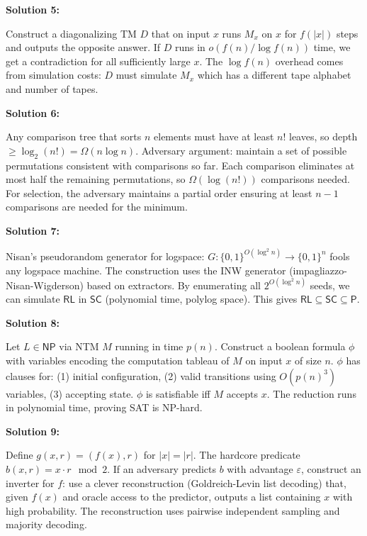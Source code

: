 \documentclass[12pt,a4paper]{exam}
\begin{document}
\textbf{Solution 5:}

Construct a diagonalizing TM $D$ that on input $x$ runs $M_x$ on $x$ for $f(|x|)$ steps and outputs the opposite answer. If $D$ runs in $o(f(n)/\log f(n))$ time, we get a contradiction for all sufficiently large $x$. The $\log f(n)$ overhead comes from simulation costs: $D$ must simulate $M_x$ which has a different tape alphabet and number of tapes.

\vspace{0.5cm}

\textbf{Solution 6:}

Any comparison tree that sorts $n$ elements must have at least $n!$ leaves, so depth $\geq \log_2(n!) = \Omega(n \log n)$. Adversary argument: maintain a set of possible permutations consistent with comparisons so far. Each comparison eliminates at most half the remaining permutations, so $\Omega(\log(n!))$ comparisons needed. For selection, the adversary maintains a partial order ensuring at least $n-1$ comparisons are needed for the minimum.

\vspace{0.5cm}

\textbf{Solution 7:}

Nisan's pseudorandom generator for logspace: $G: \{0,1\}^{O(\log^2 n)} \to \{0,1\}^{n}$ fools any logspace machine. The construction uses the INW generator (impagliazzo-Nisan-Wigderson) based on extractors. By enumerating all $2^{O(\log^2 n)}$ seeds, we can simulate $\mathsf{RL}$ in $\mathsf{SC}$ (polynomial time, polylog space). This gives $\mathsf{RL} \subseteq \mathsf{SC} \subseteq \mathsf{P}$.

\vspace{0.5cm}

\textbf{Solution 8:}

Let $L \in \mathsf{NP}$ via NTM $M$ running in time $p(n)$. Construct a boolean formula $\phi$ with variables encoding the computation tableau of $M$ on input $x$ of size $n$. $\phi$ has clauses for: (1) initial configuration, (2) valid transitions using $O(p(n)^3)$ variables, (3) accepting state. $\phi$ is satisfiable iff $M$ accepts $x$. The reduction runs in polynomial time, proving SAT is NP-hard.

\vspace{0.5cm}

\textbf{Solution 9:}

Define $g(x,r) = (f(x), r)$ for $|x| = |r|$. The hardcore predicate $b(x,r) = x \cdot r \mod 2$. If an adversary predicts $b$ with advantage $\varepsilon$, construct an inverter for $f$: use a clever reconstruction (Goldreich-Levin list decoding) that, given $f(x)$ and oracle access to the predictor, outputs a list containing $x$ with high probability. The reconstruction uses pairwise independent sampling and majority decoding.
\end{document}
